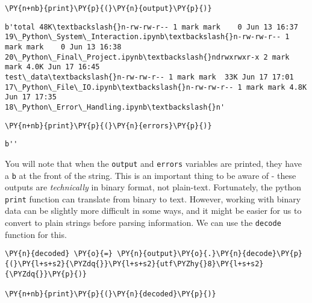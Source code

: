     \begin{tcolorbox}[breakable, size=fbox, boxrule=1pt, pad at break*=1mm,colback=cellbackground, colframe=cellborder]
\begin{Verbatim}[commandchars=\\\{\}]
\PY{n+nb}{print}\PY{p}{(}\PY{n}{output}\PY{p}{)}
\end{Verbatim}
\end{tcolorbox}

    \begin{Verbatim}[commandchars=\\\{\}]
b'total 48K\textbackslash{}n-rw-rw-r-- 1 mark mark    0 Jun 13 16:37
19\_Python\_System\_Interaction.ipynb\textbackslash{}n-rw-rw-r-- 1 mark mark    0 Jun 13 16:38
20\_Python\_Final\_Project.ipynb\textbackslash{}ndrwxrwxr-x 2 mark mark 4.0K Jun 17 16:45
test\_data\textbackslash{}n-rw-rw-r-- 1 mark mark  33K Jun 17 17:01
17\_Python\_File\_IO.ipynb\textbackslash{}n-rw-rw-r-- 1 mark mark 4.8K Jun 17 17:35
18\_Python\_Error\_Handling.ipynb\textbackslash{}n'
    \end{Verbatim}

    \begin{tcolorbox}[breakable, size=fbox, boxrule=1pt, pad at break*=1mm,colback=cellbackground, colframe=cellborder]
\begin{Verbatim}[commandchars=\\\{\}]
\PY{n+nb}{print}\PY{p}{(}\PY{n}{errors}\PY{p}{)}
\end{Verbatim}
\end{tcolorbox}

    \begin{Verbatim}[commandchars=\\\{\}]
b''
    \end{Verbatim}

    You will note that when the \texttt{output} and \texttt{errors}
variables are printed, they have a \texttt{b} at the front of the
string. This is an important thing to be aware of - these outputs are
\emph{technically} in binary format, not plain-text. Fortunately, the
python \texttt{print} function can translate from binary to text.
However, working with binary data can be slightly more difficult in some
ways, and it might be easier for us to convert to plain strings before
parsing information. We can use the \texttt{decode} function for this.

    \begin{tcolorbox}[breakable, size=fbox, boxrule=1pt, pad at break*=1mm,colback=cellbackground, colframe=cellborder]
\begin{Verbatim}[commandchars=\\\{\}]
\PY{n}{decoded} \PY{o}{=} \PY{n}{output}\PY{o}{.}\PY{n}{decode}\PY{p}{(}\PY{l+s+s2}{\PYZdq{}}\PY{l+s+s2}{utf\PYZhy{}8}\PY{l+s+s2}{\PYZdq{}}\PY{p}{)}

\PY{n+nb}{print}\PY{p}{(}\PY{n}{decoded}\PY{p}{)}
\end{Verbatim}
\end{tcolorbox}

